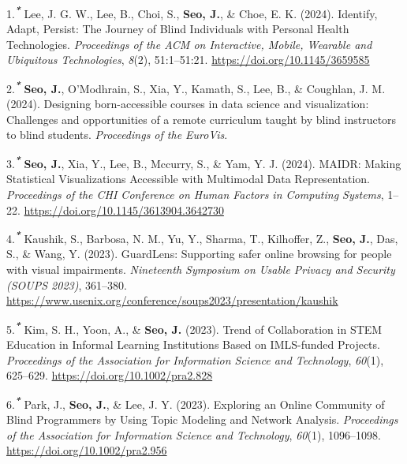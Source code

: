 \documentclass[11pt,a4paper,]{awesome-cv}
\newlength{\cslhangindent}
\newenvironment{CSLReferences}[2] %
 {\begin{list}{}{%
  \setlength{\itemindent}{0pt}
  \setlength{\leftmargin}{0pt}
  \setlength{\parsep}{0pt}
  \ifodd #1
   \setlength{\leftmargin}{\cslhangindent}
   \setlength{\itemindent}{-1\cslhangindent}
  \fi
  \setlength{\itemsep}{#2\baselineskip}}}
 {\end{list}}
\begin{document}
\label{refs-6f9f665fcc3712b756e6d2676940109e}
\begin{CSLReferences}{1}{0}
1.\textsuperscript{\textbf{\emph{*}}} Lee, J. G. W., Lee, B., Choi, S.,
\textbf{Seo, J.}, \& Choe, E. K. (2024). Identify, Adapt, Persist: The
Journey of Blind Individuals with Personal Health Technologies.
\emph{Proceedings of the ACM on Interactive, Mobile, Wearable and
Ubiquitous Technologies}, \emph{8}(2), 51:1--51:21.
\url{https://doi.org/10.1145/3659585}

2.\textsuperscript{\textbf{\emph{*}}} \textbf{Seo, J.}, O'Modhrain, S.,
Xia, Y., Kamath, S., Lee, B., \& Coughlan, J. M. (2024). Designing
born-accessible courses in data science and visualization: Challenges
and opportunities of a remote curriculum taught by blind instructors to
blind students. \emph{Proceedings of the EuroVis}.

3.\textsuperscript{\textbf{\emph{*}}} \textbf{Seo, J.}, Xia, Y., Lee,
B., Mccurry, S., \& Yam, Y. J. (2024). MAIDR: Making Statistical
Visualizations Accessible with Multimodal Data Representation.
\emph{Proceedings of the CHI Conference on Human Factors in Computing
Systems}, 1--22. \url{https://doi.org/10.1145/3613904.3642730}

4.\textsuperscript{\textbf{\emph{*}}} Kaushik, S., Barbosa, N. M., Yu,
Y., Sharma, T., Kilhoffer, Z., \textbf{Seo, J.}, Das, S., \& Wang, Y.
(2023). GuardLens: Supporting safer online browsing for people with
visual impairments. \emph{Nineteenth Symposium on Usable Privacy and
Security (SOUPS 2023)}, 361--380.
\url{https://www.usenix.org/conference/soups2023/presentation/kaushik}

5.\textsuperscript{\textbf{\emph{*}}} Kim, S. H., Yoon, A., \&
\textbf{Seo, J.} (2023). Trend of Collaboration in STEM Education in
Informal Learning Institutions Based on IMLS-funded Projects.
\emph{Proceedings of the Association for Information Science and
Technology}, \emph{60}(1), 625--629.
\url{https://doi.org/10.1002/pra2.828}

6.\textsuperscript{\textbf{\emph{*}}} Park, J., \textbf{Seo, J.}, \&
Lee, J. Y. (2023). Exploring an Online Community of Blind Programmers by
Using Topic Modeling and Network Analysis. \emph{Proceedings of the
Association for Information Science and Technology}, \emph{60}(1),
1096--1098. \url{https://doi.org/10.1002/pra2.956}


\end{CSLReferences}
\end{document}
